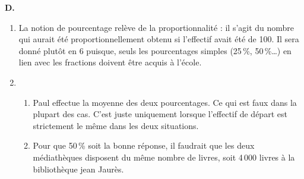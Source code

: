 {\bf D.}
\begin{enumerate}
   \item La notion de pourcentage relève de la proportionnalité : il s'agit du nombre qui aurait été proportionnellement obtenu si l'effectif avait été de 100. Il sera donné plutôt en 6 puisque, seuls les pourcentages simples (25\,\%, 50\,\%\dots) en lien avec les fractions doivent être acquis à l'école.
   \item
   \begin{enumerate}
      \item Paul effectue la moyenne des deux pourcentages. Ce qui est faux dans la plupart des cas. C'est juste uniquement lorsque l'effectif de départ est strictement le même dans les deux situations.
      \item Pour que 50\,\% soit la bonne réponse, il faudrait que les deux médiathèques disposent du même nombre de livres, soit 4\,000 livres à la bibliothèque jean Jaurès.
   \end{enumerate}
\end{enumerate}
